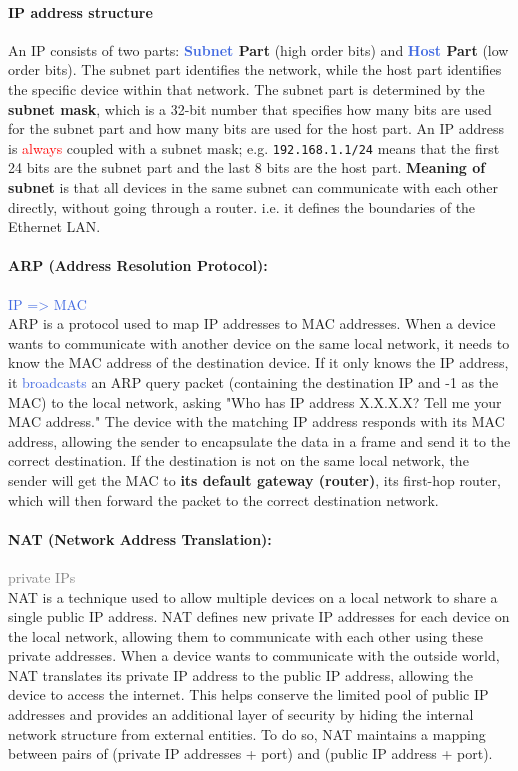 \documentclass[openany,12pt]{book}
\newcommand{\code}[1]{\texttt{#1}}
\newcommand{\red}[1]{\textcolor{Red}{#1}}
\newcommand{\blue}[1]{\textcolor{RoyalBlue}{#1}}
\newcommand{\gray}[1]{\textcolor{gray}{#1}}
\begin{document}
\paragraph{IP address structure} An IP consists of two parts: \textbf{\blue{Subnet} Part} (high order bits) and \textbf{\blue{Host} Part} (low order bits). The subnet part identifies the network, while the host part identifies the specific device within that network. The subnet part is determined by the \textbf{subnet mask}, which is a 32-bit number that specifies how many bits are used for the subnet part and how many bits are used for the host part. An IP address is \red{always} coupled with a subnet mask; e.g. \code{192.168.1.1/24} means that the first 24 bits are the subnet part and the last 8 bits are the host part. \textbf{Meaning of subnet} is that all devices in the same subnet can communicate with each other directly, without going through a router. i.e. it defines the boundaries of the Ethernet LAN.


\paragraph{ARP (Address Resolution Protocol):} \blue{IP => MAC} \\
ARP is a protocol used to map IP addresses to MAC addresses. When a device wants to communicate with another device on the same local network, it needs to know the MAC address of the destination device. If it only knows the IP address, it \blue{broadcasts} an ARP query packet (containing the destination IP and -1 as the MAC) to the local network, asking "Who has IP address X.X.X.X? Tell me your MAC address." The device with the matching IP address responds with its MAC address, allowing the sender to encapsulate the data in a frame and send it to the correct destination. If the destination is not on the same local network, the sender will get the MAC to \textbf{its default gateway (router)}, its first-hop router, which will then forward the packet to the correct destination network.

\paragraph{NAT (Network Address Translation):} \gray{private IPs} \\
NAT is a technique used to allow multiple devices on a local network to share a single public IP address. NAT defines new private IP addresses for each device on the local network, allowing them to communicate with each other using these private addresses. When a device wants to communicate with the outside world, NAT translates its private IP address to the public IP address, allowing the device to access the internet. This helps conserve the limited pool of public IP addresses and provides an additional layer of security by hiding the internal network structure from external entities. To do so, NAT maintains a mapping between pairs of (private IP addresses + port) and (public IP address + port).
\end{document}

